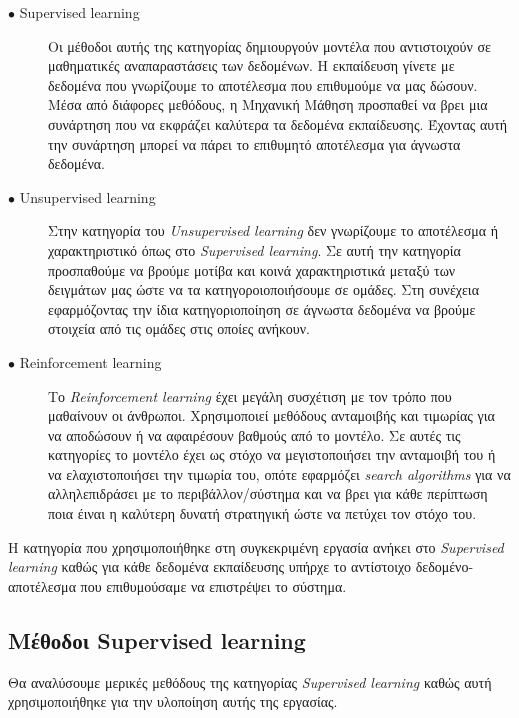 \begin{description}

\item[$\bullet$ Supervised learning] Οι μέθοδοι αυτής της κατηγορίας δημιουργούν μοντέλα που αντιστοιχούν σε μαθηματικές αναπαραστάσεις των δεδομένων. Η εκπαίδευση γίνετε με δεδομένα που γνωρίζουμε το αποτέλεσμα που επιθυμούμε να μας δώσουν. Μέσα από διάφορες μεθόδους, η Μηχανική Μάθηση προσπαθεί να βρει μια συνάρτηση που να εκφράζει καλύτερα τα δεδομένα εκπαίδευσης. Έχοντας αυτή την συνάρτηση μπορεί να πάρει το επιθυμητό αποτέλεσμα για άγνωστα δεδομένα.

\item[$\bullet$ Unsupervised learning] Στην κατηγορία του \textit{Unsupervised learning} δεν γνωρίζουμε το αποτέλεσμα ή χαρακτηριστικό όπως στο \textit{Supervised learning}. Σε αυτή την κατηγορία προσπαθούμε να βρούμε μοτίβα και κοινά χαρακτηριστικά μεταξύ των δειγμάτων μας ώστε να τα κατηγοροιοποιήσουμε σε ομάδες. Στη συνέχεια εφαρμόζοντας την ίδια κατηγοριοποίηση σε άγνωστα δεδομένα να βρούμε στοιχεία από τις ομάδες στις οποίες ανήκουν.

\item[$\bullet$ Reinforcement learning] Το \textit{Reinforcement learning} έχει μεγάλη συσχέτιση με τον τρόπο που μαθαίνουν οι άνθρωποι. Χρησιμοποιεί μεθόδους ανταμοιβής και τιμωρίας για να αποδώσουν ή να αφαιρέσουν βαθμούς από το μοντέλο. Σε αυτές τις κατηγορίες το μοντέλο έχει ως στόχο να μεγιστοποιήσει την ανταμοιβή του ή να ελαχιστοποιήσει την τιμωρία του, οπότε εφαρμόζει \textit{search algorithms} για να αλληλεπιδράσει με το περιβάλλον/σύστημα και να βρει για κάθε περίπτωση ποια έιναι η καλύτερη δυνατή στρατηγική ώστε να πετύχει τον στόχο του.

\end{description}

Η κατηγορία που χρησιμοποιήθηκε στη συγκεκριμένη εργασία ανήκει στο \textit{Supervised learning} καθώς για κάθε δεδομένα εκπαίδευσης υπήρχε το αντίστοιχο δεδομένο-αποτέλεσμα που επιθυμούσαμε να επιστρέψει το σύστημα.

\subsection{Μέθοδοι Supervised learning}
Θα αναλύσουμε μερικές μεθόδους της κατηγορίας \textit{Supervised learning} καθώς αυτή χρησιμοποιήθηκε για την υλοποίηση αυτής της εργασίας.

